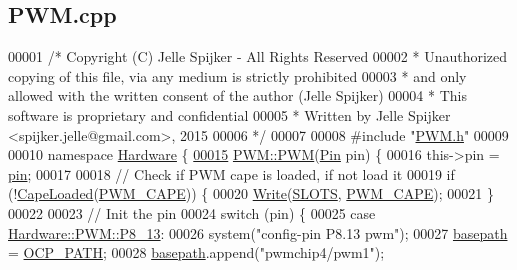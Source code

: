 \hypertarget{_p_w_m_8cpp_source}{}\subsection{P\+W\+M.\+cpp}
\label{_p_w_m_8cpp_source}

\begin{DoxyCode}
00001 \textcolor{comment}{/* Copyright (C) Jelle Spijker - All Rights Reserved}
00002 \textcolor{comment}{ * Unauthorized copying of this file, via any medium is strictly prohibited}
00003 \textcolor{comment}{ * and only allowed with the written consent of the author (Jelle Spijker)}
00004 \textcolor{comment}{ * This software is proprietary and confidential}
00005 \textcolor{comment}{ * Written by Jelle Spijker <spijker.jelle@gmail.com>, 2015}
00006 \textcolor{comment}{ */}
00007 
00008 \textcolor{preprocessor}{#include "\hyperlink{_p_w_m_8h}{PWM.h}"}
00009 
00010 \textcolor{keyword}{namespace }\hyperlink{namespace_hardware}{Hardware} \{
\hypertarget{_p_w_m_8cpp_source_l00015}{}\hyperlink{class_hardware_1_1_p_w_m_ac5608137ddc798aa26c505ec6edb8458}{00015} \hyperlink{class_hardware_1_1_p_w_m_ac5608137ddc798aa26c505ec6edb8458}{PWM::PWM}(\hyperlink{class_hardware_1_1_p_w_m_a7cc6acf1c28f0eaef16246635dc0353a}{Pin} pin) \{
00016   this->pin = \hyperlink{class_hardware_1_1_p_w_m_a47a155962c7c376bf1fe27c15c1e1e1d}{pin};
00017 
00018   \textcolor{comment}{// Check if PWM cape is loaded, if not load it}
00019   \textcolor{keywordflow}{if} (!\hyperlink{class_hardware_1_1_b_b_b_aaf2f732c771eac0b1ee984dbc0bca784}{CapeLoaded}(\hyperlink{_p_w_m_8h_a107564a7febd186a238d8af86893ca9b}{PWM\_CAPE})) \{
00020     \hyperlink{class_hardware_1_1_b_b_b_a155cc06f76d82a6b690ce5ea08e7c68e}{Write}(\hyperlink{_b_b_b_8h_a3de26a5dbd2276c1486afbba5fc8de59}{SLOTS}, \hyperlink{_p_w_m_8h_a107564a7febd186a238d8af86893ca9b}{PWM\_CAPE});
00021   \}
00022 
00023   \textcolor{comment}{// Init the pin}
00024   \textcolor{keywordflow}{switch} (pin) \{
00025   \textcolor{keywordflow}{case} \hyperlink{class_hardware_1_1_p_w_m_a7cc6acf1c28f0eaef16246635dc0353aa234e15810d56fe4504c4919b13990253}{Hardware::PWM::P8\_13}:
00026     system(\textcolor{stringliteral}{"config-pin P8.13 pwm"});
00027     \hyperlink{class_hardware_1_1_p_w_m_a344f82a0812dceb40aa48d4789d09c68}{basepath} = \hyperlink{_p_w_m_8h_ac59f8e6888c0a1e33c63203c7b39126c}{OCP\_PATH};
00028     \hyperlink{class_hardware_1_1_p_w_m_a344f82a0812dceb40aa48d4789d09c68}{basepath}.append(\textcolor{stringliteral}{"pwmchip4/pwm1"});

\end{DoxyCode}
